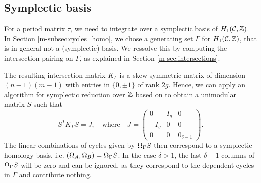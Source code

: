 \documentclass[main.tex]{subfiles}
\begin{document}

  \subsection{Symplectic basis}\label{subsec:symp_basis}

  For a period matrix $\tau$, we need to integrate over a symplectic basis of $H_1(\mathcal{C},\mathbb{Z})$. In Section \ref{m-subsec:cycles_homo}, we chose a generating set $\Gamma$ for $H_1(\mathcal{C},\mathbb{Z})$, that is in general not
  a (symplectic) basis. We ressolve this by computing the intersection pairing on $\Gamma$, as explained in Section \ref{m-sec:intersections}. 
  
  The resulting intersection matrix $K_{\Gamma}$
   is a skew-symmetric matrix of dimension \\ $(n-1)(m-1)$ with entries in $\{ 0,\pm 1\}$ of rank $2g$. Hence, we can apply an algorithm
  for symplectic reduction over $\mathbb{Z}$ based on
    \cite[Theorem 18]{KB2002} to obtain a unimodular matrix $S$ such that
  $$S^T K_{\Gamma}  S = J, \quad \text{where} \quad J = \begin{pmatrix} 0 & I_g & 0 \\ -I_g & 0 & 0 \\ 0 & 0 & 0_{\delta-1} \end{pmatrix}.$$
  The linear combinations of cycles given by $\Omega_{\Gamma} S$ then correspond to a symplectic homology basis, i.e. $(\Omega_A,\Omega_B) = \Omega_{\Gamma} S$.
  In the case $\delta > 1$,
  the last $\delta-1$ columns of $\Omega_{\Gamma} S$ will be zero and can be ignored, as they correspond to the dependent cycles
  in $\Gamma$ and contribute nothing.


\biblio
\end{document}
